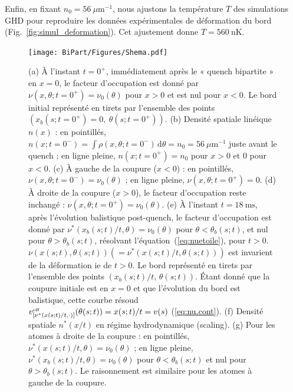 \medskip 

Enfin, en fixant \(n_0 = 56~\mu\mathrm{m}^{-1}\), nous ajustons la température \(T\) des simulations GHD pour reproduire les données expérimentales de déformation du bord (Fig.~\ref{fig:simul_deformation}). Cet ajustement donne \(T = 560~\mathrm{nK}\).

\begin{figure}[!htb]
	\centering
	\texttt{[image: BiPart/Figures/Shema.pdf]}
	\caption{
(a) À l'instant $t = 0^+$, immédiatement après le « quench bipartite » en $x = 0$, le facteur d'occupation est donné par $\nu(x, \theta ; t = 0^+) = \nu_0(\theta)$ pour $x > 0$ et est nul pour $x < 0$. Le bord initial représenté en tirets par l'ensemble des points $(x_b(s; t = 0^+) = 0,\ \theta(s; t = 0^+))$.
(b) Densité spatiale linéique $n(x)$ : en pointillés, $n(x; t = 0^-) = \int \rho(x, \theta; t = 0^-) \, \mathrm{d}\theta = n_0 = 56~\mu\mathrm{m}^{-1}$ juste avant le quench ; en ligne pleine, $n(x; t = 0^+) = n_0$ pour $x > 0$ et $0$ pour $x < 0$.
(c) À gauche de la coupure ($x < 0$) : en pointillés, $\nu(x, \theta ; t = 0^-) = \nu_0(\theta)$ ; en ligne pleine, $\nu(x, \theta ; t = 0^+) = 0$.
(d) À droite de la coupure ($x > 0$), le facteur d'occupation reste inchangé : $\nu(x, \theta ; t = 0^+) = \nu_0(\theta)$.
(e) À l'instant $t = 18~\mathrm{ms}$, après l'évolution balistique post-quench, le facteur d'occupation est donné par $\nu^\ast(x_b(s;t)/t, \theta) = \nu_0(\theta)$ pour $\theta < \theta_b(s;t)$, et nul pour $\theta > \theta_b(s;t)$, résolvant l'équation~(\ref{eq:nuetoile}), pour $t>0$. $\nu(x(s;t), \theta(s;t))(=\nu^\ast(x(s;t)/t, \theta(s;t)))$ est invarient de la déformation ie de $t>0$.  Le bord représenté en tirets par l'ensemble des points $(x_b(s; t)/t,\, \theta(s; t))$. Étant donné que la coupure initiale est en $x = 0$ et que l’évolution du bord est balistique, cette courbe résoud $v^{\mbox{\tiny eff}}_{[\nu^\ast(x(s; t)/t, \cdot) ]}(\theta(s; t)) = x(s; t)/t = v(s)$ (\ref{eq:nu.cont}).
(f) Densité spatiale  $n^\ast(x/t)$ en régime hydrodynamique (scaling).
(g) Pour les atomes à droite de la coupure : en pointillés, $\nu^\ast(x(s;t)/t, \theta) = \nu_0(\theta)$ ; en ligne pleine, $\nu^\ast(x_b(s;t)/t, \theta) = \nu_0(\theta)$ pour $\theta < \theta_b(s;t)$ et nul pour $\theta > \theta_b(s;t)$. Le raisonnement est similaire pour les atomes à gauche de la coupure.
}
	\label{fig:BiPart.coupure1}
	
\end{figure}
%
%
